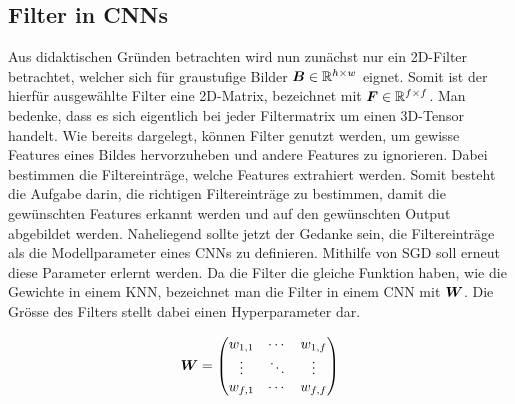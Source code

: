 \para{}
\cite{wiki:sobel_operator}
\cite{deeplearning.ai:cnn}
\cite{wiki:kernel}


\subsection{Filter in CNNs}
Aus didaktischen Gründen betrachten wird nun zunächst
nur ein 2D-Filter betrachtet, welcher sich für graustufige Bilder
$\bm{B} \in \mathbb{R}^{h \times w}$ eignet. Somit ist der hierfür ausgewählte
Filter eine 2D-Matrix, bezeichnet mit $\bm{F} \in \mathbb{R}^{f \times
  f}$. Man bedenke, dass es sich eigentlich bei jeder Filtermatrix
um einen 3D-Tensor handelt.
\para{}
Wie bereits dargelegt, können Filter genutzt werden, um gewisse
Features eines Bildes hervorzuheben und andere Features zu ignorieren. Dabei
bestimmen die Filtereinträge, welche Features extrahiert werden. Somit besteht
die Aufgabe darin, die richtigen Filtereinträge zu bestimmen, damit die
gewünschten Features erkannt werden und auf den gewünschten Output abgebildet
werden. Naheliegend sollte jetzt der Gedanke sein, die Filtereinträge als die
Modellparameter eines CNNs zu definieren.
Mithilfe von SGD soll erneut diese Parameter
erlernt werden.
\para{}
Da die Filter die gleiche Funktion haben, wie die Gewichte in einem KNN,
bezeichnet man die Filter in einem CNN mit $\bm{W}$. Die Grösse des Filters
stellt dabei einen Hyperparameter dar.

\begin{equation*}
  \bm{W} = \begin{pmatrix}
    w_{1,1} & \cdots & w_{1,f} \\
    \vdots & \ddots & \vdots \\
    w_{f,1} & \cdots & w_{f,f}
  \end{pmatrix}
\end{equation*}


